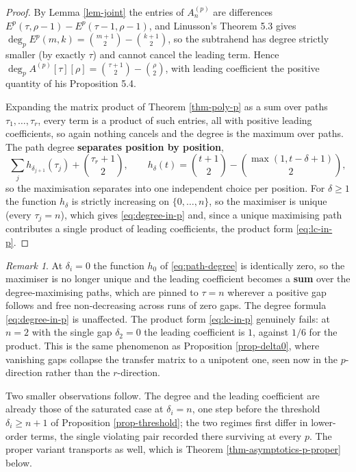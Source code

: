 \documentclass[11pt, a4paper, abstract=yes]{scrartcl}
\theoremstyle{definition}
\theoremstyle{remark}
\newtheorem{remark}[definition]{Remark}
\theoremstyle{plain}
\begin{document}
\begin{proof}
By Lemma \ref{lem-joint} the entries of \(A^{(p)}_n\) are differences \(E^p(\tau,\rho-1)-E^p(\tau-1,\rho-1)\),
and Linusson's Theorem 5.3 gives \(\deg_pE^p(m,k)=\binom{m+1}{2}-\binom{k+1}{2}\), so the subtrahend has degree
strictly smaller (by exactly \(\tau\)) and cannot cancel the leading term. Hence
\(\deg_pA^{(p)}[\tau][\rho]=\binom{\tau+1}{2}-\binom{\rho}{2}\), with leading coefficient the positive quantity
of his Proposition 5.4.

Expanding the matrix product of Theorem \ref{thm-poly-p} as a sum over paths
\(\tau_1,\dots,\tau_r\), every term is a product of such entries, all with positive leading
coefficients, so again nothing cancels and the degree is the maximum over paths. The path degree
\textbf{separates position by position},
\begin{equation}\label{eq:path-degree}
  \sum_{j}h_{\delta_{j+1}}(\tau_j)+\binom{\tau_r+1}{2},
  \qquad h_\delta(t)=\binom{t+1}{2}-\binom{\max(1,t-\delta+1)}{2},
\end{equation}
so the maximisation separates into one independent choice per position. For \(\delta\ge1\)
the function \(h_\delta\) is strictly increasing on \(\lbrace0,\dots,n\rbrace\), so the maximiser is
unique (every \(\tau_j=n\)), which gives \eqref{eq:degree-in-p} and, since a unique maximising
path contributes a single product of leading coefficients, the product form \eqref{eq:lc-in-p}.
\end{proof}

\begin{remark}
At \(\delta_i=0\) the function \(h_0\) of \eqref{eq:path-degree} is identically zero, so the
maximiser is no longer unique and the leading coefficient becomes a \textbf{sum} over the degree-maximising
paths, which are pinned to \(\tau=n\) wherever a positive gap follows and free non-decreasing
across runs of zero gaps. The degree formula \eqref{eq:degree-in-p} is unaffected. The product form
\eqref{eq:lc-in-p} genuinely fails: at \(n=2\) with the single gap \(\delta_2=0\) the leading
coefficient is \(1\), against \(1/6\) for the product. This is the same phenomenon as
Proposition \ref{prop-delta0}, where vanishing gaps collapse the transfer matrix to a unipotent one,
seen now in the \(p\)-direction rather than the \(r\)-direction.

Two smaller observations follow. The degree and the leading coefficient are already those of the
saturated case at \(\delta_i=n\), one step before the threshold \(\delta_i\ge n+1\) of
Proposition \ref{prop-threshold}; the two regimes first differ in lower-order terms, the single
violating pair recorded there surviving at every \(p\). The proper variant transports as well,
which is Theorem \ref{thm-asymptotics-p-proper} below.
\label{rem-asymptotics-zero-gaps}
\end{remark}
\end{document}

